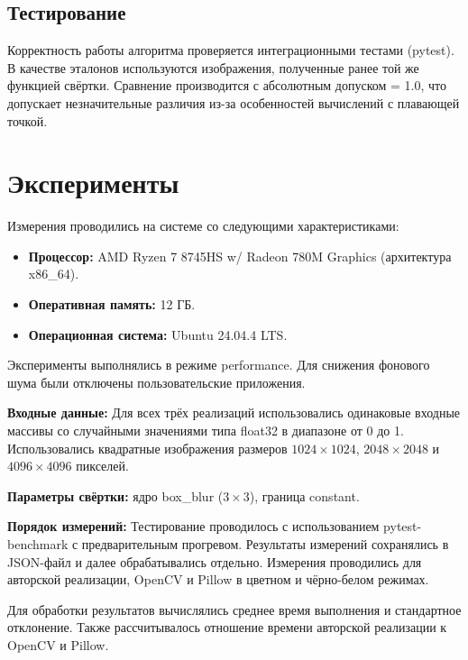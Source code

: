 \documentclass[a4paper]{article}
\begin{document}
\subsection{Тестирование}

Корректность  работы алгоритма проверяется интеграционными тестами (pytest). В качестве эталонов используются изображения, полученные ранее той же функцией свёртки. Сравнение производится с абсолютным допуском = 1.0, что допускает незначительные различия из-за особенностей вычислений с плавающей точкой.

\section{Эксперименты}

Измерения проводились на системе со следующими характеристиками:

\begin{itemize}

\item \textbf{Процессор:} AMD Ryzen 7 8745HS w/ Radeon 780M Graphics (архитектура x86\_64).

\item \textbf{Оперативная память:} 12 ГБ.

\item \textbf{Операционная система:} Ubuntu 24.04.4 LTS.

\end{itemize}

Эксперименты выполнялись в режиме performance. Для снижения фонового шума были отключены пользовательские приложения.

\textbf{Входные данные: } Для всех трёх реализаций использовались одинаковые входные массивы со случайными значениями типа float32 в диапазоне от 0 до 1. Использовались квадратные изображения размеров $1024\times 1024$, $2048\times 2048$ и $4096\times 4096$ пикселей.

\textbf{Параметры свёртки: } ядро box\_blur ($3\times 3$), граница constant.

\textbf{Порядок измерений:} Тестирование проводилось с использованием pytest-benchmark с предварительным прогревом. Результаты измерений сохранялись в JSON-файл и далее обрабатывались отдельно. Измерения проводились для авторской реализации, OpenCV и Pillow в цветном и чёрно-белом режимах.

Для обработки результатов вычислялись среднее время выполнения и стандартное отклонение. Также рассчитывалось отношение времени авторской реализации к OpenCV и Pillow.
\end{document}
